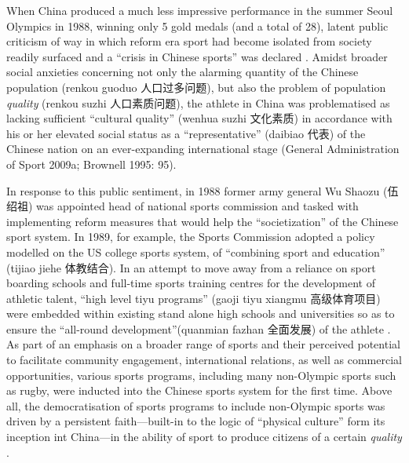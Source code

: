   When China produced a much less impressive performance in the summer Seoul Olympics in 1988, winning only 5 gold medals (and a total of 28), latent public criticism of way in which reform era sport had become isolated from society readily surfaced and a ``crisis in Chinese sports'' was declared \citep[199]{Brownell1995}.  Amidst broader social anxieties concerning not only the alarming quantity of the Chinese population (renkou guoduo 人口过多问题), but also the problem of population \textit{quality} (renkou suzhi 人口素质问题), the athlete in China was problematised as lacking sufficient ``cultural quality'' (wenhua suzhi 文化素质) in accordance with his or her elevated social status as a ``representative'' (daibiao 代表) of the Chinese nation on an ever-expanding international stage (General Administration of Sport 2009a; Brownell 1995: 95).

  In response to this public sentiment, in 1988 former army general Wu Shaozu (伍绍祖) was
  appointed head of national sports commission and tasked with implementing reform measures that would help the ``societization'' of the Chinese sport system. In 1989, for example, the Sports Commission adopted a policy modelled on the US college sports system, of ``combining sport and education'' (tijiao jiehe 体教结合).  In an attempt to move away from a reliance on sport boarding schools and full-time sports training centres for the development of athletic talent, ``high level tiyu programs'' (gaoji tiyu xiangmu 高级体育项目) were embedded within existing stand alone high schools and universities so as to ensure the ``all-round development''(quanmian fazhan 全面发展) of the athlete \citep[203]{Brownell1995}.  As part of an emphasis on a broader range of sports and their perceived potential to facilitate community engagement, international relations, as well as commercial opportunities, various sports programs, including many non-Olympic sports such as rugby, were inducted into the Chinese sports system for the first time\citep[70]{Knuttgen1990}.  Above all, the  democratisation of sports programs to include non-Olympic sports was driven by a persistent faith---built-in to the logic of ``physical culture'' form its inception int China---in the ability of sport to produce citizens of a certain \textit{quality} \citep[7]{Woronov2003}.

